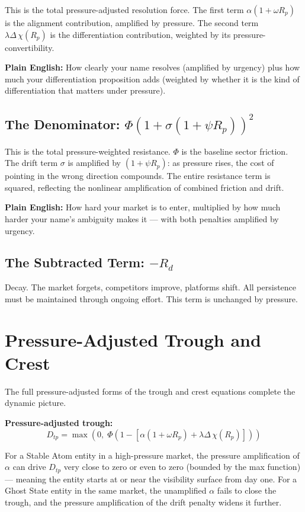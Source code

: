 \documentclass[12pt, openany]{book}
\theoremstyle{thmstyle}
\theoremstyle{defstyle}
\begin{document}
This is the total pressure-adjusted resolution force. The first term $\alpha(1 + \omega R_p)$ is the alignment contribution, amplified by pressure. The second term $\lambda\Delta\,\chi(R_p)$ is the differentiation contribution, weighted by its pressure-convertibility.

\textbf{Plain English:} How clearly your name resolves (amplified by urgency) plus how much your differentiation proposition adds (weighted by whether it is the kind of differentiation that matters under pressure).

\subsection{The Denominator: $\Phi(1 + \sigma(1 + \psi R_p))^2$}

This is the total pressure-weighted resistance. $\Phi$ is the baseline sector friction. The drift term $\sigma$ is amplified by $(1 + \psi R_p)$: as pressure rises, the cost of pointing in the wrong direction compounds. The entire resistance term is squared, reflecting the nonlinear amplification of combined friction and drift.

\textbf{Plain English:} How hard your market is to enter, multiplied by how much harder your name's ambiguity makes it --- with both penalties amplified by urgency.

\subsection{The Subtracted Term: $-R_d$}

Decay. The market forgets, competitors improve, platforms shift. All persistence must be maintained through ongoing effort. This term is unchanged by pressure.

\section{Pressure-Adjusted Trough and Crest}

The full pressure-adjusted forms of the trough and crest equations complete the dynamic picture.

\textbf{Pressure-adjusted trough:}
\begin{equation}
D_{tp} = \max\!\left(0,\; \Phi\!\left(1 - \left[\alpha(1+\omega R_p) + \lambda\Delta\,\chi(R_p)\right]\right)\right)
\label{eq:pressure_trough}
\end{equation}

For a Stable Atom entity in a high-pressure market, the pressure amplification of $\alpha$ can drive $D_{tp}$ very close to zero or even to zero (bounded by the max function) --- meaning the entity starts at or near the visibility surface from day one. For a Ghost State entity in the same market, the unamplified $\alpha$ fails to close the trough, and the pressure amplification of the drift penalty widens it further.
\end{document}

